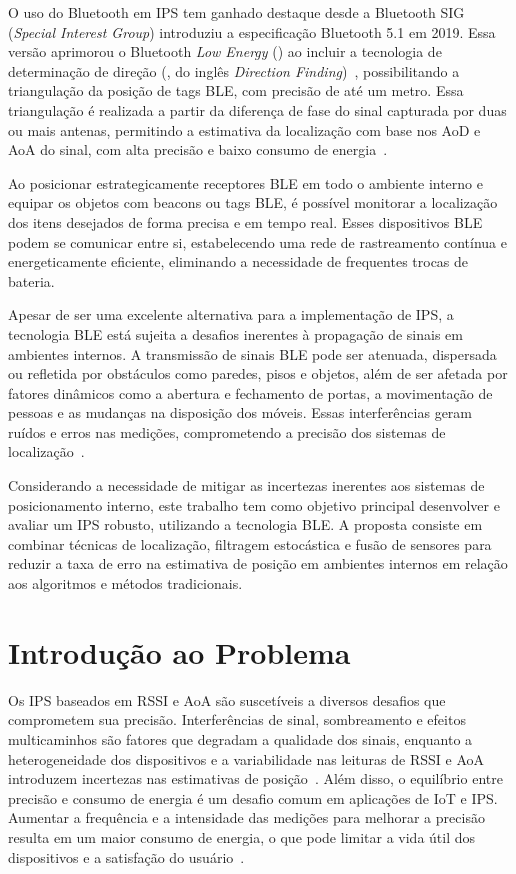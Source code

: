 O uso do Bluetooth em IPS tem ganhado destaque desde a Bluetooth SIG (\textit{Special Interest Group}) introduziu a especificação Bluetooth 5.1 em 2019. Essa versão aprimorou o Bluetooth \textit{Low Energy} () ao incluir a tecnologia de determinação de direção (, do inglês \textit{Direction Finding})~\cite{bluetooth51Core},  possibilitando a triangulação da posição de tags BLE, com precisão de até um metro. Essa triangulação é realizada a partir da diferença de fase do sinal capturada por duas ou mais antenas, permitindo a estimativa da localização com base nos AoD e AoA do sinal, com alta precisão e baixo consumo de energia~\cite{pau_bluetooth_2021}.

Ao posicionar estrategicamente receptores BLE em todo o ambiente interno e equipar os objetos com beacons ou tags BLE, é possível monitorar a localização dos itens desejados de forma precisa e em tempo real. Esses dispositivos BLE podem se comunicar entre si, estabelecendo uma rede de rastreamento contínua e energeticamente eficiente, eliminando a necessidade de frequentes trocas de bateria.

Apesar de ser uma excelente alternativa para a implementação de IPS, a tecnologia BLE está sujeita a desafios inerentes à propagação de sinais em ambientes internos. A transmissão de sinais BLE pode ser atenuada, dispersada ou refletida por obstáculos como paredes, pisos e objetos, além de ser afetada por fatores dinâmicos como a abertura e fechamento de portas, a movimentação de pessoas e as mudanças na disposição dos móveis. Essas interferências geram ruídos e erros nas medições, comprometendo a precisão dos sistemas de localização~\cite{Engström2020}.

Considerando a necessidade de mitigar as incertezas inerentes aos sistemas de posicionamento interno, este trabalho tem como objetivo principal desenvolver e avaliar um IPS robusto, utilizando a tecnologia BLE. A proposta consiste em combinar técnicas de localização, filtragem estocástica e fusão de sensores para reduzir a taxa de erro na estimativa de posição em ambientes internos em relação aos algoritmos e métodos tradicionais.

\section{Introdução ao Problema}\label{sec:intro_problema}

Os IPS baseados em RSSI e AoA são suscetíveis a diversos desafios que comprometem sua precisão. Interferências de sinal, sombreamento e efeitos multicaminhos são fatores que degradam a qualidade dos sinais, enquanto a heterogeneidade dos dispositivos e a variabilidade nas leituras de RSSI e AoA introduzem incertezas nas estimativas de posição~\cite{Guo2023}. Além disso, o equilíbrio entre precisão e consumo de energia é um desafio comum em aplicações de IoT e IPS. Aumentar a frequência e a intensidade das medições para melhorar a precisão resulta em um maior consumo de energia, o que pode limitar a vida útil dos dispositivos e a satisfação do usuário~\cite{Farahsari2022}.

